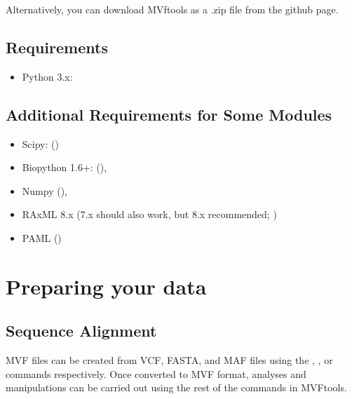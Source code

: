 \documentclass[letterpaper,11pt,english]{sphinxmanual}
\begin{document}
Alternatively, you can download MVftools as a .zip file from the github page.


\subsection{Requirements}
\label{\detokenize{intro:requirements}}\begin{itemize}
\item {} 
Python 3.x: 

\end{itemize}


\subsection{Additional Requirements for Some Modules}
\label{\detokenize{intro:additional-requirements-for-some-modules}}\begin{itemize}
\item {} 
Scipy: ()

\item {} 
Biopython 1.6+: (),

\item {} 
Numpy (),

\item {} 
RAxML 8.x (7.x should also work, but 8.x recommended; )

\item {} 
PAML ()

\end{itemize}


\section{Preparing your data}
\label{\detokenize{intro:preparing-your-data}}

\subsection{Sequence Alignment}
\label{\detokenize{intro:sequence-alignment}}
MVF files can be created from VCF, FASTA, and MAF files using the , , or  commands respectively.  Once converted to MVF format, analyses and manipulations can be carried out using the rest of the commands in MVFtools.
\end{document}
